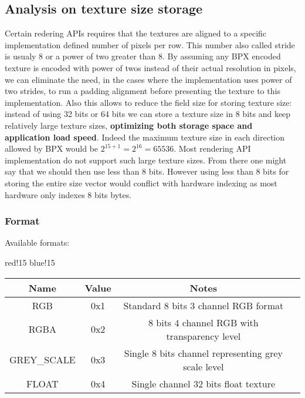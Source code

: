 \subsection{Analysis on texture size storage}
Certain redering APIs requires that the textures are aligned to a specific implementation defined number of pixels per row. This number also called stride is usualy 8 or a power of two greater than 8.\newline
By assuming any BPX encoded texture is encoded with power of twos instead of their actual resolution in pixels, we can eliminate the need, in the cases where the implementation uses power of two strides, to run a padding alignment before presenting the texture to this implementation. Also this allows to reduce the field size for storing texture size: instead of using 32 bits or 64 bits we can store a texture size in 8 bits and keep relatively large texture sizes, \textbf{optimizing both storage space and application load speed}. Indeed the maximum texture size in each direction allowed by BPX would be $2^{15 + 1} = 2^{16} = 65536$. Most rendering API implementation do not support such large texture sizes.\newline
From there one might say that we should then use less than 8 bits. However using less than 8 bits for storing the entire size vector would conflict with hardware indexing as most hardware only indexes 8 bits bytes.

\subsubsection{Format}
Available formats:
\begin{center}
    {
        {red!15}
        {blue!15}
        \begin{tabular}{|c|c|c|c|}
            \hline
            \textbf{Name} & \textbf{Value} & \textbf{Notes} \\

            \hline\hline
            RGB & 0x1 & Standard 8 bits 3 channel RGB format \\
            RGBA & 0x2 & 8 bits 4 channel RGB with transparency level \\
            GREY\_SCALE & 0x3 & Single 8 bits channel representing grey scale level \\
            FLOAT & 0x4 & Single channel 32 bits float texture \\
            \hline
        \end{tabular}
    }
\end{center}

